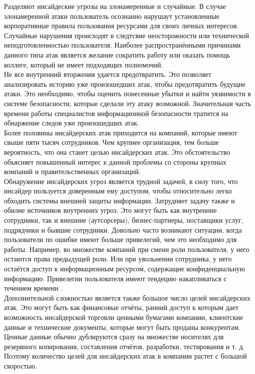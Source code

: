 Разделяют инсайдеские угрозы на злонамеренные и случайные. В случае злонамеренной атаки пользователь осознанно нарушаут установленные корпоративные правила пользования ресурсами для своих личных интересов. Случайные нарушения происходят в следтсвие неосторожности или технической неподготовленностью пользователя. Наиболее распространёнными причинами данного типа атак является желание сократить работу или оказать помощь коллеге, который не имеет подходящих полномочий. \\

Не все внутренний вторжения удается предотвратить. Это позволяет анализировать историю уже произошедших атак, чтобы предотвратить будущие атаки. Это необходимо, чтобы оценить понесенные убытки и найти уязвимости в системе безопасности, которые сделали эту атаку возможной. Значительная часть времени работы специалистов информационной безопасности тратится на обнаржение следов уже произошедших атак.\\

Более половины инсайдерских атак приходится на компаний, которые имеют свыше пяти тысяч сотрудников. \cite{ponemonReport2020}
Чем крупнее организация, тем больше вероятность, что она станет целью инсайдерских атак. Это обстоятельство объясняет повышенный интерес к данной проблемы со стороны крупных компаний и правительственных организаций.\\

Обнаружение инсайдерских угроз является трудной задачей, в силу того, что инсайдер пользуется доверенным ему доступом, чтобы относительно легко обходить системы внешней защиты информации. Затрудняет задачу также и обилие источников внутренних угроз. Это могут быть как внутренние сотрудники, так и внешние (аутсорсеры), бизнес-партнеры, поставщики услуг, подрядчики и бывшие сотрудники. Довольно часто возникают ситуации, когда пользователи по ошибке имеют больше привелегий, чем это необходимо для работы. Например, во множестве компаний при смени роли пользователя, у него остаются права предыдущей роли. Или при увольнении сотрудника, у него остаётся доступ к информационным ресурсом, содержащие конфиденциальную информацию. Привелегии пользователя имеют тендецию накапливаться с течением времени \cite{exabeam}.\\

Дополнительной сложностью является также большое число целей инсайдерских атак. Это могут быть как финансовые отчёты, ранний доступ к которым дает возможность инсайдерской торговли ценными бумагами компании, клиентские данные и технические документы, которые могут быть проданы конкурентам. Ценные данные обычно дублируются сразу на множестве носителях для резервного копирования, составления отчётов, разработки, тестирования и т. д. Поэтому количество целей для инсайдерских атак в компании растет с большой скоростью.\\

